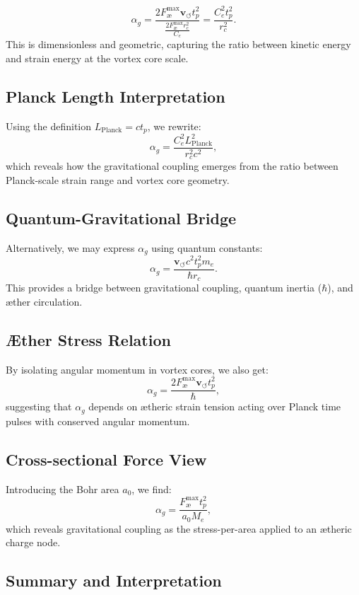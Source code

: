 \documentclass[12pt]{article}
\begin{document}
\[
    \alpha_g = \frac{2 F^{\text{max}}_{\text{\ae}} \mathbf{v}_{\scriptscriptstyle\boldsymbol{\circlearrowleft}} t_p^2}{\frac{2 F^{\text{max}}_{\text{\ae}} r_c^2}{C_e}} = \frac{C_e^2 t_p^2}{r_c^2}.
\]
This is dimensionless and geometric, capturing the ratio between kinetic energy and strain energy at the vortex core scale.

\subsection*{Planck Length Interpretation}

Using the definition $L_{\text{Planck}} = c t_p$, we rewrite:
\[
    \alpha_g = \frac{C_e^2 L_{\text{Planck}}^2}{r_c^2 c^2},
\]
which reveals how the gravitational coupling emerges from the ratio between Planck-scale strain range and vortex core geometry.

\subsection{Quantum-Gravitational Bridge}

Alternatively, we may express $\alpha_g$ using quantum constants:
\[
    \alpha_g = \frac{\mathbf{v}_{\scriptscriptstyle\boldsymbol{\circlearrowleft}} c^2 t_p^2 m_e}{\hbar r_c}.
\]
This provides a bridge between gravitational coupling, quantum inertia ($\hbar$), and æther circulation.

\subsection*{Æther Stress Relation}

By isolating angular momentum in vortex cores, we also get:
\[
    \alpha_g = \frac{2 F^{\text{max}}_{\text{\ae}} \mathbf{v}_{\scriptscriptstyle\boldsymbol{\circlearrowleft}} t_p^2}{\hbar},
\]
suggesting that $\alpha_g$ depends on ætheric strain tension acting over Planck time pulses with conserved angular momentum.

\subsection*{Cross-sectional Force View}

Introducing the Bohr area $a_0$, we find:
\[
    \alpha_g = \frac{F^{\text{max}}_{\text{\ae}} t_p^2}{a_0 M_e},
\]
which reveals gravitational coupling as the stress-per-area applied to an ætheric charge node.

\subsection*{Summary and Interpretation}
\end{document}
